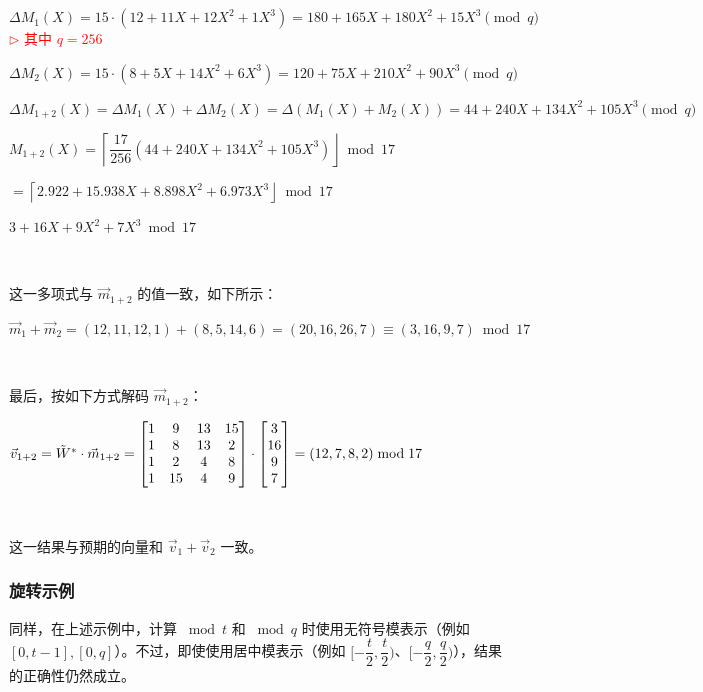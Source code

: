 $ $

$ $

$\Delta M_1(X) = 15\cdot(12 + 11X + 12X^2 + 1X^3) = 180 + 165X + 180X^2 + 15X^3 \pmod{q}$ \textcolor{red}{ $\rhd$ 其中 $q = 256$}

$\Delta M_2(X) = 15\cdot(8 + 5X + 14X^2 + 6X^3) = 120 + 75X + 210X^2 + 90X^3 \pmod{q}$

$\Delta M_{1+2}(X) = \Delta M_1(X) + \Delta M_2(X) = \Delta (M_1(X) + M_2(X)) = 44 + 240X + 134X^2 + 105X^3 \pmod{q}$

$M_{1+2}(X) =\left\lceil\dfrac{17}{256}(44 + 240X + 134X^2 + 105X^3)\right\rfloor \bmod 17$

$= \left\lceil2.922 + 15.938X + 8.898X^2 + 6.973X^3\right\rfloor \bmod 17$

$3 + 16X + 9X^2 + 7X^3 \bmod 17 $

$ $


这一多项式与 $\vec{m}_{1+2}$ 的值一致，如下所示：

$\vec{m}_1 + \vec{m}_2 = (12, 11, 12, 1) + (8, 5, 14, 6) = (20, 16, 26, 7) \equiv (3, 16, 9, 7) \bmod 17$

$ $

最后，按如下方式解码 $\vec{m}_{1+2}$：



$\vec{v}_{1+2} = \tilde{W}^* \cdot \vec{m}_{1+2} = \begin{bmatrix}
1 & 9 & 13 & 15\\
1 & 8 & 13 & 2\\
1 & 2 & 4 & 8\\
1 & 15 & 4 & 9\\
\end{bmatrix} \cdot \begin{bmatrix}3\\16\\9\\7\end{bmatrix} = (12, 7, 8, 2) \bmod{17}$

$ $

这一结果与预期的向量和 $\vec{v}_1 + \vec{v}_2$ 一致。




\subsubsection{旋转示例}
\label{subsubsec:bfv-rotation-ex}

同样，在上述示例中，计算 $\bmod t$ 和 $\bmod q$ 时使用无符号模表示（例如 $[0, t-1], [0, q]$）。不过，即使使用居中模表示（例如 $[-\dfrac{t}{2}, \dfrac{t}{2})$、$[-\dfrac{q}{2}, \dfrac{q}{2})$），结果的正确性仍然成立。

